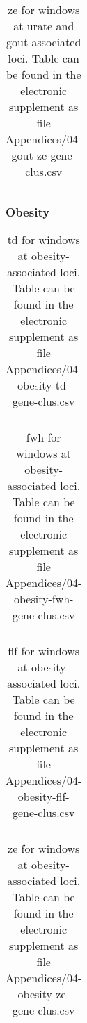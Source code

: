 \documentclass[twoside,openright]{report}
\begin{document}
\begin{appendices}
\begin{table}[!htb]
\caption[\gls{ze} for windows at urate and gout-associated loci.]{\gls{ze} for windows at urate and gout-associated loci. Table can be found in the electronic supplement as file Appendices/04-gout-ze-gene-clus.csv}
\centering
  \begin{tabular}{l l}
  \end{tabular}
  \label{tab:goutzegeneclus}
\end{table}

\FloatBarrier

\subsubsection{Obesity}\label{obesity}

\begin{table}[!htb]
\caption[\gls{td} for windows at obesity-associated loci.]{\gls{td} for windows at obesity-associated loci. Table can be found in the electronic supplement as file Appendices/04-obesity-td-gene-clus.csv}
\centering
  \begin{tabular}{l l}
  \end{tabular}
  \label{tab:obesitytdgeneclus}
\end{table}

\begin{table}[!htb]
\caption[\gls{fwh} for windows at obesity-associated loci.]{\gls{fwh} for windows at obesity-associated loci. Table can be found in the electronic supplement as file Appendices/04-obesity-fwh-gene-clus.csv}
\centering
  \begin{tabular}{l l}
  \end{tabular}
  \label{tab:obesityfwhgeneclus}
\end{table}

\begin{table}[!htb]
\caption[\gls{flf} for windows at obesity-associated loci.]{\gls{flf} for windows at obesity-associated loci. Table can be found in the electronic supplement as file Appendices/04-obesity-flf-gene-clus.csv}
\centering
  \begin{tabular}{l l}
  \end{tabular}
  \label{tab:obesityflfgeneclus}
\end{table}

\begin{table}[!htb]
\caption[\gls{ze} for windows at obesity-associated loci.]{\gls{ze} for windows at obesity-associated loci. Table can be found in the electronic supplement as file Appendices/04-obesity-ze-gene-clus.csv}
\centering
  \begin{tabular}{l l}
  \end{tabular}
  \label{tab:obesityzegeneclus}
\end{table}


\end{appendices}
\end{document}
